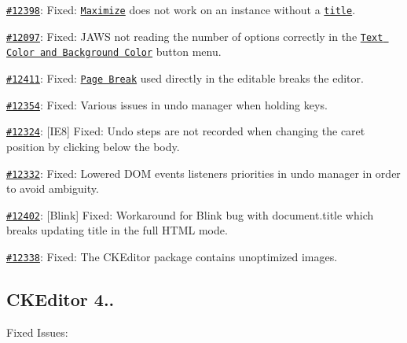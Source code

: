 \begin{DoxyItemize}
\item \href{http://dev.ckeditor.com/ticket/12398}{\tt \#12398}\+: Fixed\+: \href{http://ckeditor.com/addon/maximize}{\tt Maximize} does not work on an instance without a \href{http://docs.ckeditor.com/#!/api/CKEDITOR.config-cfg-title}{\tt title}.
\item \href{http://dev.ckeditor.com/ticket/12097}{\tt \#12097}\+: Fixed\+: J\+A\+WS not reading the number of options correctly in the \href{http://ckeditor.com/addon/colorbutton}{\tt Text Color and Background Color} button menu.
\item \href{http://dev.ckeditor.com/ticket/12411}{\tt \#12411}\+: Fixed\+: \href{http://ckeditor.com/addon/pagebreak}{\tt Page Break} used directly in the editable breaks the editor.
\item \href{http://dev.ckeditor.com/ticket/12354}{\tt \#12354}\+: Fixed\+: Various issues in undo manager when holding keys.
\item \href{http://dev.ckeditor.com/ticket/12324}{\tt \#12324}\+: \mbox{[}I\+E8\mbox{]} Fixed\+: Undo steps are not recorded when changing the caret position by clicking below the body.
\item \href{http://dev.ckeditor.com/ticket/12332}{\tt \#12332}\+: Fixed\+: Lowered D\+OM events listeners\textquotesingle{} priorities in undo manager in order to avoid ambiguity.
\item \href{http://dev.ckeditor.com/ticket/12402}{\tt \#12402}\+: \mbox{[}Blink\mbox{]} Fixed\+: Workaround for Blink bug with {\ttfamily document.\+title} which breaks updating title in the full H\+T\+ML mode.
\item \href{http://dev.ckeditor.com/ticket/12338}{\tt \#12338}\+: Fixed\+: The C\+K\+Editor package contains unoptimized images.
\end{DoxyItemize}

\subsection*{C\+K\+Editor 4..}

Fixed Issues\+:


